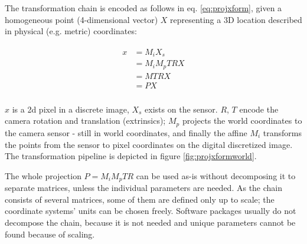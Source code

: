 
The transformation chain is encoded as follows in eq. \ref{eq:projxform}, given a homogeneous point (4-dimensional vector) $X$ representing a 3D location described in physical (e.g. metric) coordinates:

\begin{align} \label{eq:projxform} \begin{split}
	x
	&= M_i X_s\\
	&= M_i M_p T R X\\
	&= M T R X\\
	&= P X\\
\end{split} \end{align}

$x$ is a 2d pixel in a discrete image, $X_s$ exists on the sensor.
$R$, $T$ encode the camera rotation and translation (extrinsics);
$M_p$ projects the world coordinates to the camera sensor - still in world coordinates, and finally the affine $M_i$ transforms the points from the sensor to pixel coordinates on the digital discretized image.
The transformation pipeline is depicted in figure \ref{fig:projxformworld}.



The whole projection $P = M_i M_p T R$ can be used as-is without decomposing it to separate matrices, unless the individual parameters are needed. As the chain consists of several matrices, some of them are defined only up to scale; the coordinate systems' units can be chosen freely. Software packages usually do not decompose the chain, because it is not needed and unique parameters cannot be found because of scaling.


